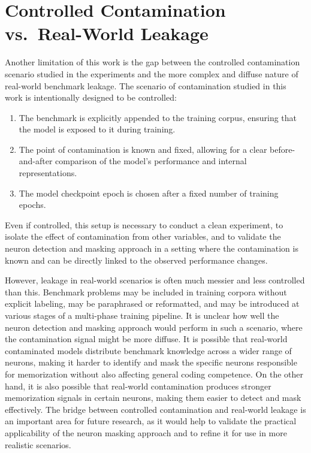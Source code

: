 \documentclass[mscthesis]{usiinfthesis}
\begin{document}
\section{Controlled Contamination vs.\ Real-World Leakage}
Another limitation of this work is the gap between the controlled contamination scenario studied in the experiments and the more complex and diffuse nature of real-world benchmark leakage.
The scenario of contamination studied in this work is intentionally designed to be controlled:
\begin{enumerate}
	\item[(1)] The benchmark is explicitly appended to the training corpus, ensuring that the model is exposed to it during training.
	\item[(2)] The point of contamination is known and fixed, allowing for a clear before-and-after comparison of the model's performance and internal representations.
	\item[(3)] The model checkpoint epoch is chosen after a fixed number of training epochs.
\end{enumerate}
Even if controlled, this setup is necessary to conduct a clean experiment, to isolate the effect of contamination from other variables, and to validate the neuron detection and masking approach in a setting where the contamination is known and can be directly linked to the observed performance changes.
\par\vspace{1em}
However, leakage in real-world scenarios is often much messier and less controlled than this.
Benchmark problems may be included in training corpora without explicit labeling, may be paraphrased or reformatted, and may be introduced at various stages of a multi-phase training pipeline.
It is unclear how well the neuron detection and masking approach would perform in such a scenario, where the contamination signal might be more diffuse.
It is possible that real-world contaminated models distribute benchmark knowledge across a wider range of neurons, making it harder to identify and mask the specific neurons responsible for memorization without also affecting general coding competence.
On the other hand, it is also possible that real-world contamination produces stronger memorization signals in certain neurons, making them easier to detect and mask effectively.
The bridge between controlled contamination and real-world leakage is an important area for future research, as it would help to validate the practical applicability of the neuron masking approach and to refine it for use in more realistic scenarios.
\end{document}
